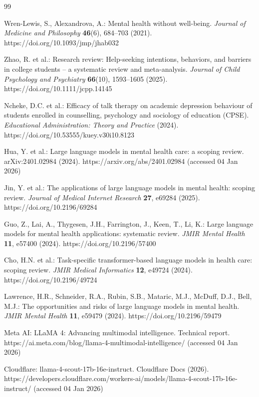 \documentclass{svproc}
\begin{document}
\begin{thebibliography}{99}

 Wren-Lewis, S., Alexandrova, A.: Mental health without well-being. \textit{Journal of Medicine and Philosophy} \textbf{46}(6), 684--703 (2021). https://doi.org/10.1093/jmp/jhab032

 Zhao, R. et al.: Research review: Help-seeking intentions, behaviors, and barriers in college students -- a systematic review and meta-analysis. \textit{Journal of Child Psychology and Psychiatry} \textbf{66}(10), 1593--1605 (2025). https://doi.org/10.1111/jcpp.14145

 Ncheke, D.C. et al.: Efficacy of talk therapy on academic depression behaviour of students enrolled in counselling, psychology and sociology of education (CPSE). \textit{Educational Administration: Theory and Practice} (2024). https://doi.org/10.53555/kuey.v30i10.8123

 Hua, Y. et al.: Large language models in mental health care: a scoping review. arXiv:2401.02984 (2024). https://arxiv.org/abs/2401.02984 (accessed 04 Jan 2026)

 Jin, Y. et al.: The applications of large language models in mental health: scoping review. \textit{Journal of Medical Internet Research} \textbf{27}, e69284 (2025). https://doi.org/10.2196/69284

 Guo, Z., Lai, A., Thygesen, J.H., Farrington, J., Keen, T., Li, K.: Large language models for mental health applications: systematic review. \textit{JMIR Mental Health} \textbf{11}, e57400 (2024). https://doi.org/10.2196/57400

 Cho, H.N. et al.: Task-specific transformer-based language models in health care: scoping review. \textit{JMIR Medical Informatics} \textbf{12}, e49724 (2024). https://doi.org/10.2196/49724

 Lawrence, H.R., Schneider, R.A., Rubin, S.B., Mataric, M.J., McDuff, D.J., Bell, M.J.: The opportunities and risks of large language models in mental health. \textit{JMIR Mental Health} \textbf{11}, e59479 (2024). https://doi.org/10.2196/59479

 Meta AI: LLaMA 4: Advancing multimodal intelligence. Technical report. https://ai.meta.com/blog/llama-4-multimodal-intelligence/ (accessed 04 Jan 2026)

 Cloudflare: llama-4-scout-17b-16e-instruct. Cloudflare Docs (2026). https://developers.cloudflare.com/workers-ai/models/llama-4-scout-17b-16e-instruct/ (accessed 04 Jan 2026)


\end{thebibliography}
\end{document}
